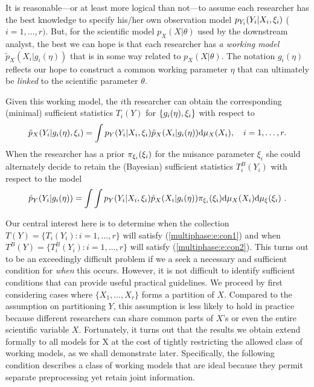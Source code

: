 It is reasonable---or at least more logical than not---to assume each researcher has the best knowledge to specify  his/her own observation model $p_{Y_i}(Y_i | X_i, \xi_i)$ ($i=1,\ldots, r)$. But, for the scientific model $p_X(X|\theta)$ used by the downstream analyst, the best we can hope is that each researcher has \textit{a working model} $\tilde p_X(X_{i}|g_i(\eta))$ that is in some way related to $p_X(X|\theta)$. The notation $g_i(\eta)$ reflects our hope to construct a common working parameter $\eta$ that can ultimately be \textit{linked} to the scientific parameter $\theta$. 


Given this working model, the $i$th researcher can obtain the corresponding (minimal) sufficient statistics $T_i(Y)$ for $\{ g_i(\eta), \xi_i\}$ with respect to 
\begin{equation}\label{multiphase:e:prob}
  \pwork(Y_i | g_i(\workparam), \obsparam_i) = \int \pobs(Y_i | X_i, \obsparam_i) \pwork(X_i | g_i(\workparam)) \dd \mu_X(X_i), \quad i=1,\ldots, r.
\end{equation}
When the researcher has a prior $ \pi_{\xi_i}(\xi_i)$ for the nuisance parameter $\xi_i$ she could alternately decide to retain the (Bayesian) sufficient statistics $T_i^{B}(Y_{i})$ with respect to the model 
\begin{equation}\label{multiphase:e:prom}
  \pywork(Y_i | g_i(\workparam)) = \int \int \pobs(Y_i | X_i, \obsparam_i) \pwork(X_i | g_i(\workparam)) \pi_{\obsparam_i}(\obsparam_i) \dd \mu_X(X_i) \dd \mu_\obsparam(\obsparam_i)\ .
\end{equation} 

Our central interest here is to determine when the collection $T(Y)=\{T_i(Y_i): i=1,\ldots, r\}$ will satisfy (\ref{multiphase:e:con1}) and when $T^{B}(Y)=\{T_i^B(Y_i): i=1,\ldots, r\}$ will satisfy (\ref{multiphase:e:con2}).  This turns out to be an exceedingly difficult problem if we a seek a necessary and sufficient condition for \textit{when} this occurs. However, it is not difficult to identify sufficient conditions that can provide useful practical guidelines. We proceed by first considering cases where $\{X_1, \ldots, X_r\}$ forms a partition of $X$. Compared to the assumption on partitioning $Y$, this assumption is less likely to hold in practice because different researchers can share common  parts of $X$'s or even  the entire  scientific variable $X$.
Fortunately, it turns out that the results we obtain extend formally to all models for X at the cost of tightly restricting the allowed class of working models, as we shall demonstrate later.
Specifically, the following condition describes a class of working models that are ideal because they permit separate preprocessing yet retain joint information.

